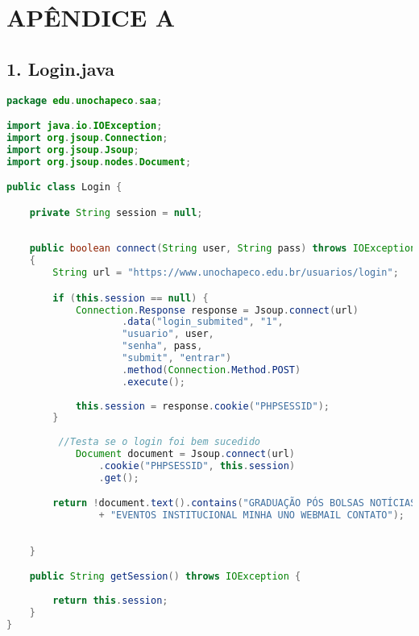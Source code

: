 \chapter*{APÊNDICE A}

\section*{1. Login.java}
\begin{lstlisting}[language=java, frame=single]
package edu.unochapeco.saa;

import java.io.IOException;
import org.jsoup.Connection;
import org.jsoup.Jsoup;
import org.jsoup.nodes.Document;

public class Login {

    private String session = null;
    
    
    public boolean connect(String user, String pass) throws IOException 
    {
        String url = "https://www.unochapeco.edu.br/usuarios/login";

        if (this.session == null) {
            Connection.Response response = Jsoup.connect(url)
                    .data("login_submited", "1",
                    "usuario", user,
                    "senha", pass,
                    "submit", "entrar")
                    .method(Connection.Method.POST)
                    .execute();
            
            this.session = response.cookie("PHPSESSID");
        }
        
         //Testa se o login foi bem sucedido
            Document document = Jsoup.connect(url)
                .cookie("PHPSESSID", this.session)
                .get();

        return !document.text().contains("GRADUAÇÃO PÓS BOLSAS NOTÍCIAS UNOWEBTV "
                + "EVENTOS INSTITUCIONAL MINHA UNO WEBMAIL CONTATO");
        
        
    }

    public String getSession() throws IOException {
        
        return this.session;
    }
}
\end{lstlisting}

